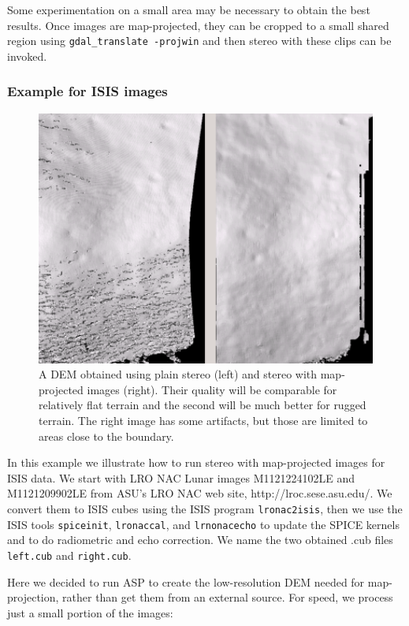 Some experimentation on a small area may be necessary to obtain the best
results. Once images are map-projected, they can be cropped to a small
shared region using \texttt{gdal\_translate -projwin} and then 
stereo with these clips can be invoked. 

\subsubsection{Example for ISIS images}

\begin{figure}[h!]
\centering
   \includegraphics[width=6.0in]{images/stereo_mapproj_400px.png}
\caption{A DEM obtained using plain stereo (left) and stereo
  with map-projected images (right). Their quality will be comparable
  for relatively flat terrain and the second will be much better for
  rugged terrain. The right image has some artifacts, but those are limited
  to areas close to the boundary.}
\label{fig:mapproj-example}
\end{figure}

In this example we illustrate how to run stereo with map-projected
images for ISIS data. We start with LRO NAC Lunar images M1121224102LE
and M1121209902LE from ASU's LRO NAC web site,
http://lroc.sese.asu.edu/. We convert them to ISIS cubes using the ISIS
program \texttt{lronac2isis}, then we use the ISIS tools
\texttt{spiceinit}, \texttt{lronaccal}, and \texttt{lrnonacecho} to
update the SPICE kernels and to do radiometric and echo correction. We
name the two obtained .cub files \texttt{left.cub} and
\texttt{right.cub}.

Here we decided to run ASP to create the low-resolution DEM needed for
map-projection, rather than get them from an external source. For speed,
we process just a small portion of the images:

